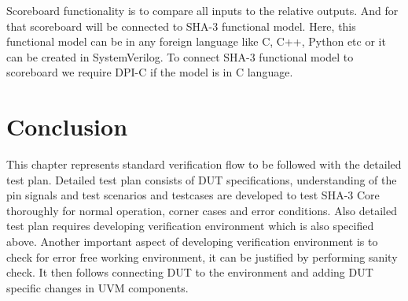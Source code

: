 Scoreboard functionality is to compare all inputs to the relative outputs. And for that scoreboard will be connected to SHA-3 functional model. Here, this functional model can be in any foreign language like C, C++, Python etc or it can be created in SystemVerilog. To connect SHA-3 functional model to scoreboard we require DPI-C if the model is in C language.

\section{Conclusion}

This chapter represents standard verification flow to be followed with the detailed test plan. Detailed test plan consists of DUT specifications, understanding of the pin signals and test scenarios and testcases are developed to test SHA-3 Core thoroughly for normal operation, corner cases and error conditions. Also detailed test plan requires developing verification environment which is also specified above. Another important aspect of developing verification environment is to check for error free working environment, it can be justified by performing sanity check. It then follows connecting DUT to the environment and adding DUT specific changes in UVM components.

